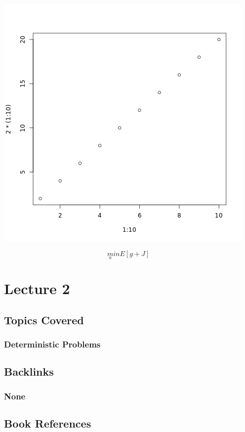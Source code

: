 \documentclass[11pt]{article}
\begin{document}
\begin{center}
\includegraphics[width=.9\linewidth]{basic.png}
\end{center}


$$\underset{u}min E[g+J]$$


\section*{Lecture 2}
\label{sec:org2ce8768}
\subsection*{Topics Covered}
\label{sec:org0d782ea}
\subsubsection*{Deterministic Problems}
\label{sec:org41aa3c3}
\subsection*{Backlinks}
\label{sec:org34537b6}
\subsubsection*{None}
\label{sec:org3e5a59f}
\subsection*{Book References}
\label{sec:org79c27ee}
\end{document}
